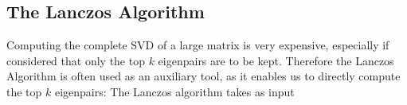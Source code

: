 \subsection{The Lanczos Algorithm}

Computing the complete SVD of a large matrix is very expensive, especially if considered that only the top $k$ eigenpairs are to be kept. Therefore the Lanczos Algorithm is often used as an auxiliary tool, as it enables us to directly compute the top $k$ eigenpairs: The Lanczos algorithm takes as input 



